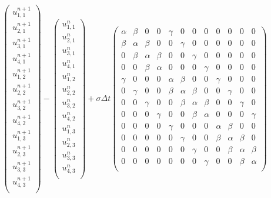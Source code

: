 \documentclass[11pt]{article}
\begin{document}
\setcounter{MaxMatrixCols}{12}
\begin{equation}
\left(
\begin{array}{c}
u^{n+1}_{1,1}\\
u^{n+1}_{2,1}\\
u^{n+1}_{3,1}\\
u^{n+1}_{4,1}\\
u^{n+1}_{1,2}\\
u^{n+1}_{2,2}\\
u^{n+1}_{3,2}\\
u^{n+1}_{4,2}\\
u^{n+1}_{1,3}\\
u^{n+1}_{2,3}\\
u^{n+1}_{3,3}\\
u^{n+1}_{4,3}\\
\end{array}
\right)
-
\left(
\begin{array}{c}
u^{n}_{1,1}\\
u^{n}_{2,1}\\
u^{n}_{3,1}\\
u^{n}_{4,1}\\
u^{n}_{1,2}\\
u^{n}_{2,2}\\
u^{n}_{3,2}\\
u^{n}_{4,2}\\
u^{n}_{1,3}\\
u^{n}_{2,3}\\
u^{n}_{3,3}\\
u^{n}_{4,3}\\
\end{array}
\right)
+ 
\sigma \Delta t 
\begin{pmatrix}
\alpha & \beta & 0 & 0 & \gamma & 0 & 0 & 0 & 0 & 0 & 0 & 0 \\
\beta & \alpha & \beta & 0 & 0 & \gamma & 0 & 0 & 0 & 0 & 0 & 0 \\
0 & \beta & \alpha & \beta & 0 & 0 & \gamma & 0 & 0 & 0 & 0 & 0 \\
0 & 0 & \beta & \alpha & 0 & 0 & 0 & \gamma & 0 & 0 & 0 & 0 \\
\gamma & 0 & 0 & 0 & \alpha & \beta & 0 & 0 & \gamma & 0 & 0 & 0 \\
0 & \gamma & 0 & 0 & \beta & \alpha & \beta & 0 & 0 & \gamma & 0 & 0 \\
0 & 0 & \gamma & 0 & 0 & \beta & \alpha & \beta & 0 & 0 & \gamma & 0 \\
0 & 0 & 0 & \gamma & 0 & 0 & \beta & \alpha & 0 & 0 & 0 & \gamma \\
0 & 0 & 0 & 0 & \gamma & 0 & 0 & 0 & \alpha & \beta & 0 & 0 \\
0 & 0 & 0 & 0 & 0 & \gamma & 0 & 0 & \beta & \alpha & \beta & 0 \\
0 & 0 & 0 & 0 & 0 & 0 & \gamma & 0 & 0 & \beta & \alpha & \beta \\
0 & 0 & 0 & 0 & 0 & 0 & 0 & \gamma & 0 & 0 & \beta & \alpha \\


\end{pmatrix}
\end{equation}
\end{document}
